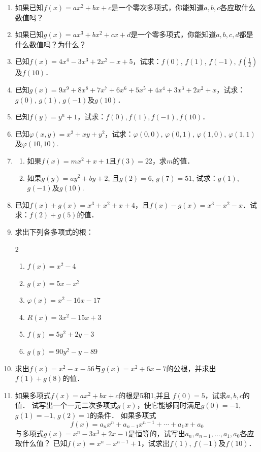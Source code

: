 \begin{enumerate}
\item 如果已知$f(x)=ax^2+bx+c$是一个零次多项式，你能知道$a,b,c$各应取什么数值吗？
\item 如果已知$g(x)=ax^3+bx^2+cx+d$是一个零多项式，你能知道$a,b,c,d$都是什么数值吗？为什么？
\item 已知$f(x)=4x^4-3x^3+2x^2-x+5$，试求：$f(0)$, $f(1)$, $f(-1)$, $f\left(\frac{1}{2}\right)$及$f(10)$．
\item 已知$g(x)=9x^9+8x^8+7x^7+6x^6+5x^5+4x^4+3x^3+2x^2+x$，试求：$g(0)$, $g(1)$, $g(-1)$及$g(10)$．

\item 已知$f(y)=y^n+1$，试求：$f(0),f(1),f(-1),f(10)$．

\item 已知$\varphi(x,y)=x^2+xy+y^2$，试求：$\varphi(0, 0)$, $\varphi(0, 1)$, $\varphi(1, 0)$, $\varphi(1, 1)$及$\varphi(10, 10)$.
\item \begin{enumerate}
    \item 如果$f(x)=mx^2+x+1$且$f(3)=22$，求$m$的值．
    \item 如果$g(y)=ay^2+by+2$, 且$g(2)=6$, $g (7)=51$, 试求：$g(1)$, $g(-1)$及$g(10)$.
\end{enumerate} 

\item 已知$f(x)+g(x)=x^3+x^2+x+4$，且$f(x)-g(x)=x^3-x^2-x$．试求：$f(2)+g(5)$的值．
\item 求出下列各多项式的根：
    \begin{multicols}{2}
\begin{enumerate}
    \item $f (x) =x^2-4$
    \item $g (x) =5x-x^2$
    \item $\varphi (x) =x^2-16x-17$
    \item $R(x)=3x^2-15x+3$
    \item $f(y)=5y^2+2y-3$
    \item $g(y)=90y^2-y-89$
\end{enumerate}
 \end{multicols}

\item 求出$f(x)=x^2-x-56$与$g(x)=x^2+6x-7$的公根，并求出$f(1)+g(8)$的值．
\item 如果多项式$f(x)=ax^2+bx+c$的根是5和1,并且
$f(0)=5$，试求$a,b,c$的值．
\staritem 试写出一个一元二次多项式$g(x)$，使它能够同时满足$g(0)=-1$, $g(1)=-1$, $g(2)=1$的条件．
\staritem 如果多项式
\[f (x) =a_nx^n+a_{n-1} x^{n-1}+\cdots+a_1x+a_0\]
与多项式$g(x)=x^n-3x^3+2x-1$是恒等的，试写出$a_n,a_{n-1},\ldots,a_1,a_0$各应取什么值？
\staritem 已知$f(x)=x^n-x^{n-1}+1$，试求出$f(1)$, $f(-1)$及$f (10)$．

\end{enumerate}


